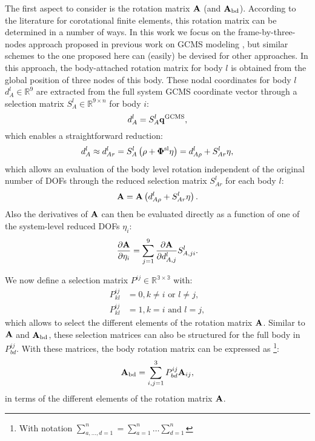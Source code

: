 The first aspect to consider is the rotation matrix $\mathbf A$ (and $\mathbf A_{\mathrm{bd}}$). 
According to the literature for corotational finite elements, this rotation matrix can be determined in a number of ways. In this work we focus on the frame-by-three-nodes approach proposed in previous work on GCMS modeling \cite{Pechstein2013}, but similar schemes to the one proposed here can (easily) be devised for other approaches. In this approach, the body-attached rotation matrix for body $l$ is obtained from the global position of three nodes of this body. These nodal coordinates for body $l$ $d_A^l \in \mathbb{R}^9$ are extracted from the full system GCMS coordinate vector through a selection matrix $S_A^l \in \mathbb{R}^{9\times n}$ for body $i$:
\begin{equation}
d_A^l = S_A^l\mathbf q^{\rm GCMS},
\end{equation}
which enables a straightforward reduction:
\begin{equation}
d_A^l \approx d_{Ar}^l = S_A^l\left(\rho+\bm \Phi^{\rm sl}\eta\right) = d_{A\rho}^l + S_{Ar}^l\eta,
\end{equation}
which allows an evaluation of the body level rotation independent of the original number of DOFs through the reduced selection matrix $S_{Ar}^l$ for each body $l$:
\begin{equation}
\mathbf A = \mathbf A\left(d_{A\rho}^l+S_{Ar}^l\eta\right).
\end{equation} 
Also the derivatives of $\mathbf A$ can then be evaluated directly as a function of one of the system-level reduced DOFs $\eta_i$:
\begin{equation}
\frac{\partial \mathbf A}{\partial \eta_i} = \sum_{j=1}^9\frac{\partial \mathbf A}{\partial d_{A,j}^l}S_{A,ji}^l.
\label{eq:rotmat_red_der}
\end{equation}


We now define a selection matrix $P^{ij}\in \mathbb{R^{3 \times 3 }}$ with:
\begin{eqnarray}
P^{ij}_{kl} &= 0, k\neq i \text{ or } l\neq j, \\
P^{ij}_{kl} &= 1, k= i \text{ and } l= j,
\end{eqnarray}
which allows to select the different elements of the rotation matrix $\mathbf A$. Similar to $\mathbf A$ and $\mathbf A_{\mathrm{bd}}$, these selection matrices can also be structured for the full body in $P^{ij}_{bd}$. With these matrices, the body rotation matrix can be expressed as \footnote{With notation $\sum_{a,\ldots,d=1}^n = \sum_{a=1}^n\ldots\sum_{d=1}^n$}:
\begin{equation}
\mathbf A_{\mathrm{bd}} = \sum_{i,j=1}^{3}P^{ij}_{bd}\mathbf A_{ij},
\end{equation}
in terms of the different elements of the rotation matrix $\mathbf A$. 

